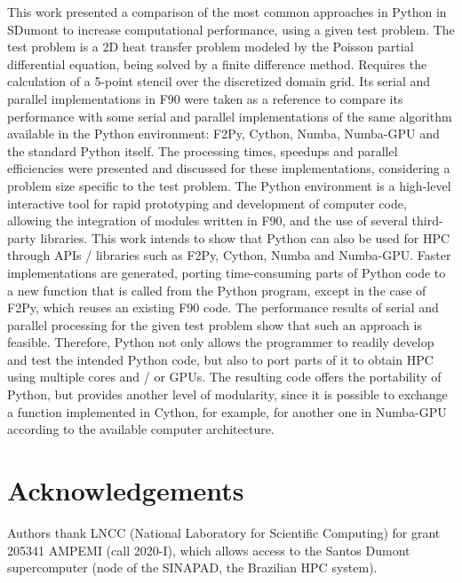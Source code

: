 \documentclass[12pt]{article}
\begin{document}
This work presented a comparison of the most common approaches in Python in SDumont to increase computational performance, using a given test problem. The test problem is a 2D heat transfer problem modeled by the Poisson partial differential equation, being solved by a finite difference method. Requires the calculation of a 5-point stencil over the discretized domain grid. Its serial and parallel implementations in F90 were taken as a reference to compare its performance with some serial and parallel implementations of the same algorithm available in the Python environment: F2Py, Cython, Numba, Numba-GPU and the standard Python itself. The processing times, speedups and parallel efficiencies were presented and discussed for these implementations, considering a problem size specific to the test problem.
The Python environment is a high-level interactive tool for rapid prototyping and development of computer code, allowing the integration of modules written in F90, and the use of several third-party libraries. This work intends to show that Python can also be used for HPC through APIs / libraries such as F2Py, Cython, Numba and Numba-GPU. Faster implementations are generated, porting time-consuming parts of Python code to a new function that is called from the Python program, except in the case of F2Py, which reuses an existing F90 code. The performance results of serial and parallel processing for the given test problem show that such an approach is feasible. Therefore, Python not only allows the programmer to readily develop and test the intended Python code, but also to port parts of it to obtain HPC using multiple cores and / or GPUs. The resulting code offers the portability of Python, but provides another level of modularity, since it is possible to exchange a function implemented in Cython, for example, for another one in Numba-GPU according to the available computer architecture.










\section{Acknowledgements}

Authors thank LNCC (National Laboratory for Scientific Computing) for grant 205341 AMPEMI (call 2020-I), which allows access to the Santos Dumont supercomputer (node of the SINAPAD, the Brazilian HPC system).












\end{document}
